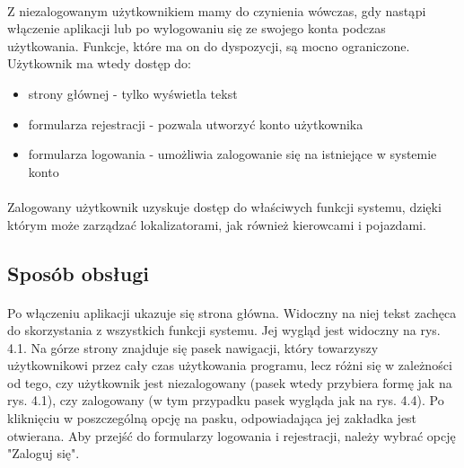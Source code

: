 \paragraph{}
Z niezalogowanym użytkownikiem mamy do czynienia wówczas, gdy nastąpi włączenie aplikacji lub po wylogowaniu się ze swojego konta podczas użytkowania. Funkcje, które ma on do dyspozycji, są mocno ograniczone. Użytkownik ma wtedy dostęp do:
\begin{itemize}
	\item strony głównej - tylko wyświetla tekst 
	\item formularza rejestracji - pozwala utworzyć konto użytkownika
	\item formularza logowania - umożliwia zalogowanie się na istniejące w systemie konto
\end{itemize}

\paragraph{}
Zalogowany użytkownik uzyskuje dostęp do właściwych funkcji systemu, dzięki którym może zarządzać lokalizatorami, jak również kierowcami i pojazdami.

\subsection{Sposób obsługi}
\paragraph{}
Po włączeniu aplikacji ukazuje się strona główna. Widoczny na niej tekst zachęca do skorzystania z wszystkich funkcji systemu. Jej wygląd jest widoczny na rys. 4.1. Na górze strony znajduje się pasek nawigacji, który towarzyszy użytkownikowi przez cały czas użytkowania programu, lecz różni się w zależności od tego, czy użytkownik jest niezalogowany (pasek wtedy przybiera formę jak na rys. 4.1), czy zalogowany (w tym przypadku pasek wygląda jak na rys. 4.4). Po kliknięciu w poszczególną opcję na pasku, odpowiadająca jej zakładka jest otwierana. Aby przejść do formularzy logowania i rejestracji, należy wybrać opcję "Zaloguj się".

